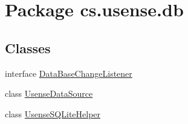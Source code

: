 \hypertarget{namespacecs_1_1usense_1_1db}{}\section{Package cs.\+usense.\+db}
\label{namespacecs_1_1usense_1_1db}
\subsection*{Classes}
\begin{DoxyCompactItemize}
\item 
interface \hyperlink{interfacecs_1_1usense_1_1db_1_1_data_base_change_listener}{Data\+Base\+Change\+Listener}
\item 
class \hyperlink{classcs_1_1usense_1_1db_1_1_usense_data_source}{Usense\+Data\+Source}
\item 
class \hyperlink{classcs_1_1usense_1_1db_1_1_usense_s_q_lite_helper}{Usense\+S\+Q\+Lite\+Helper}
\end{DoxyCompactItemize}


